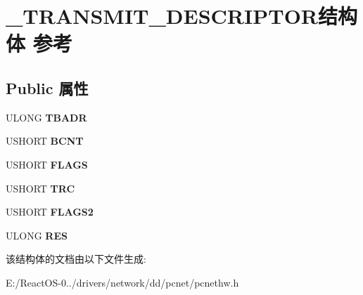 \hypertarget{struct___t_r_a_n_s_m_i_t___d_e_s_c_r_i_p_t_o_r}{}\section{\+\_\+\+T\+R\+A\+N\+S\+M\+I\+T\+\_\+\+D\+E\+S\+C\+R\+I\+P\+T\+O\+R结构体 参考}
\label{struct___t_r_a_n_s_m_i_t___d_e_s_c_r_i_p_t_o_r}
\subsection*{Public 属性}
\begin{DoxyCompactItemize}
\item 
\mbox{\label{struct___t_r_a_n_s_m_i_t___d_e_s_c_r_i_p_t_o_r_a0a1c587080da519c07ba385b9daa51e1}} 
U\+L\+O\+NG {\bfseries T\+B\+A\+DR}
\item 
\mbox{\label{struct___t_r_a_n_s_m_i_t___d_e_s_c_r_i_p_t_o_r_a0589220226a008bbcab088468c9ba2bb}} 
U\+S\+H\+O\+RT {\bfseries B\+C\+NT}
\item 
\mbox{\label{struct___t_r_a_n_s_m_i_t___d_e_s_c_r_i_p_t_o_r_aacd9adcfa10216da206bbd3058ae1583}} 
U\+S\+H\+O\+RT {\bfseries F\+L\+A\+GS}
\item 
\mbox{\label{struct___t_r_a_n_s_m_i_t___d_e_s_c_r_i_p_t_o_r_a1be069773b7b1a68e420498f5e6e310a}} 
U\+S\+H\+O\+RT {\bfseries T\+RC}
\item 
\mbox{\label{struct___t_r_a_n_s_m_i_t___d_e_s_c_r_i_p_t_o_r_a45e69f283b9b9bac0ea44ceff738cd4d}} 
U\+S\+H\+O\+RT {\bfseries F\+L\+A\+G\+S2}
\item 
\mbox{\label{struct___t_r_a_n_s_m_i_t___d_e_s_c_r_i_p_t_o_r_a6b3eb064396ab333b312601a11d13b36}} 
U\+L\+O\+NG {\bfseries R\+ES}
\end{DoxyCompactItemize}


该结构体的文档由以下文件生成\+:\begin{DoxyCompactItemize}
\item 
E\+:/\+React\+O\+S-\/0../drivers/network/dd/pcnet/pcnethw.\+h\end{DoxyCompactItemize}
